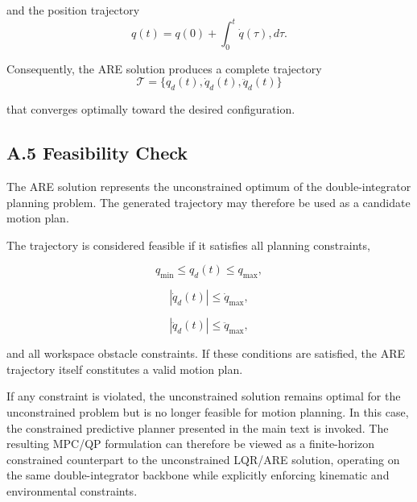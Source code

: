 and the position trajectory \[q(t) =q(0) +\int_0^t \dot q(\tau),d\tau.\]

Consequently, the ARE solution produces a complete trajectory
\[\mathcal T = \{q_d(t),\dot q_d(t),\ddot q_d(t)\}\]

that converges optimally toward the desired configuration.

\subsection{A.5 Feasibility Check}\label{a.5-feasibility-check}

The ARE solution represents the unconstrained optimum of the
double-integrator planning problem. The generated trajectory may
therefore be used as a candidate motion plan.

The trajectory is considered feasible if it satisfies all planning
constraints,

\[q_{\min} \le q_d(t) \le q_{\max},\]

\[|\dot q_d(t)| \le \dot q_{\max},\]

\[|\ddot q_d(t)| \le \ddot q_{\max},\]

and all workspace obstacle constraints. If these conditions are
satisfied, the ARE trajectory itself constitutes a valid motion plan.

If any constraint is violated, the unconstrained solution remains
optimal for the unconstrained problem but is no longer feasible for
motion planning. In this case, the constrained predictive planner
presented in the main text is invoked. The resulting MPC/QP formulation
can therefore be viewed as a finite-horizon constrained counterpart to
the unconstrained LQR/ARE solution, operating on the same
double-integrator backbone while explicitly enforcing kinematic and
environmental constraints.
